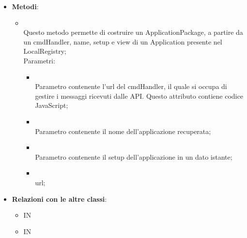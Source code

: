 \begin{itemize}
\begin{itemize}
	\end{itemize}
	\item \textbf{Metodi}:
	\begin{itemize}
		\item[]  \\
		Questo metodo permette di costruire un ApplicationPackage, a partire da un cmdHandler, name, setup e view di un Application presente nel LocalRegistry;\\
		Parametri:
		\begin{itemize}
			\item {} \\
			Parametro contenente l'url del cmdHandler, il quale si occupa di gestire i messaggi ricevuti dalle API. Questo attributo contiene codice JavaScript;
			\item {} \\
			Parametro contenente il nome dell'applicazione recuperata;
			\item {} \\
			Parametro contenente il setup dell'applicazione in un dato istante;
			\item {} \\
			url;
		\end{itemize}
	\end{itemize}
	\item \textbf{Relazioni con le altre classi}:
	\begin{itemize}
		\item IN \hyperlink{Application_label}{}
		\item IN \hyperlink{<<interface>> ApplicationRegistryClient_label}{}
	\end{itemize}
\end{itemize}

